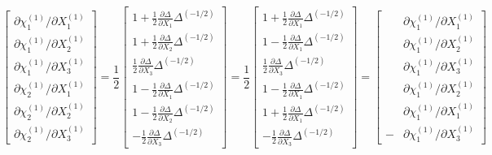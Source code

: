 \documentclass[12pt]{amsart}
\begin{document}
\begin{equation}
  \label{eq:dchi_dx_1}
  \begin{bmatrix}
    \partial\chi^{(1)}_1/\partial X^{(1)}_1\\
    \partial\chi^{(1)}_1/\partial X^{(1)}_2\\
    \partial\chi^{(1)}_1/\partial X^{(1)}_3\\
    \partial\chi^{(1)}_2/\partial X^{(1)}_1\\
    \partial\chi^{(1)}_2/\partial X^{(1)}_2\\
    \partial\chi^{(1)}_2/\partial X^{(1)}_3
  \end{bmatrix}
  =
  \frac{1}{2}
  \begin{bmatrix}
     1 +  \frac{1}{2}\frac{\partial\Delta}{\partial X_1} \Delta^{(-1/2)}   \\
     1 +  \frac{1}{2}\frac{\partial\Delta}{\partial X_2} \Delta^{(-1/2)}   \\
          \frac{1}{2}\frac{\partial\Delta}{\partial X_3} \Delta^{(-1/2)}   \\
     1 -  \frac{1}{2}\frac{\partial\Delta}{\partial X_1} \Delta^{(-1/2)}   \\
     1 -  \frac{1}{2}\frac{\partial\Delta}{\partial X_2} \Delta^{(-1/2)}   \\
         -\frac{1}{2}\frac{\partial\Delta}{\partial X_3} \Delta^{(-1/2)}
  \end{bmatrix}
  =
  \frac{1}{2}
  \begin{bmatrix}
     1 +  \frac{1}{2}\frac{\partial\Delta}{\partial X_1} \Delta^{(-1/2)}   \\
     1 -  \frac{1}{2}\frac{\partial\Delta}{\partial X_1} \Delta^{(-1/2)}   \\
          \frac{1}{2}\frac{\partial\Delta}{\partial X_3} \Delta^{(-1/2)}   \\
     1 -  \frac{1}{2}\frac{\partial\Delta}{\partial X_1} \Delta^{(-1/2)}   \\
     1 +  \frac{1}{2}\frac{\partial\Delta}{\partial X_1} \Delta^{(-1/2)}   \\
       -  \frac{1}{2}\frac{\partial\Delta}{\partial X_3} \Delta^{(-1/2)}
  \end{bmatrix}
  =
  \begin{bmatrix}
     &\partial\chi^{(1)}_1/\partial X^{(1)}_1\\
     &\partial\chi^{(1)}_1/\partial X^{(1)}_2\\
     &\partial\chi^{(1)}_1/\partial X^{(1)}_3\\
     &\partial\chi^{(1)}_1/\partial X^{(1)}_2\\
     &\partial\chi^{(1)}_1/\partial X^{(1)}_1\\
    -&\partial\chi^{(1)}_1/\partial X^{(1)}_3
  \end{bmatrix}
\end{equation}
\end{document}
